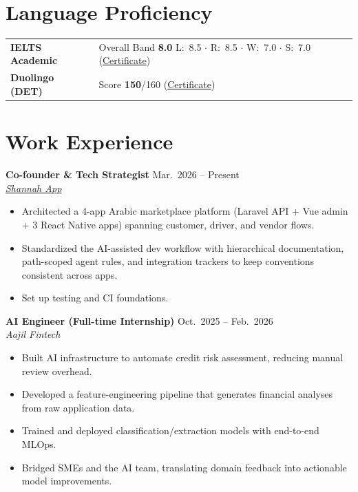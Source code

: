 \documentclass[a4paper,11pt]{article}
\begin{document}
\section{Language Proficiency}

\begin{tabular}{@{}l l@{}}
\textbf{IELTS Academic} & Overall Band \textbf{8.0} \quad L:~8.5 $\cdot$ R:~8.5 $\cdot$ W:~7.0 $\cdot$ S:~7.0 \quad (\href{https://drive.google.com/file/d/1XNIae4_Nk_kf3iOh6QK0ZJT7tzAMEPo4}{Certificate}) \\[3pt]
\textbf{Duolingo (DET)} & Score \textbf{150}/160 \quad
    (\href{https://certs.duolingo.com/hiwpvm048gwsijqu}{Certificate})
\end{tabular}

\section{Work Experience}

\textbf{Co-founder \& Tech Strategist} \hfill Mar.\ 2026 -- Present \\
\textit{\href{https://shnah.com/}{Shannah App}}
\begin{itemize}
    \item Architected a 4-app Arabic marketplace platform (Laravel API + Vue admin + 3 React Native apps) spanning customer, driver, and vendor flows.
    \item Standardized the AI-assisted dev workflow with hierarchical documentation, path-scoped agent rules, and integration trackers to keep conventions consistent across apps.
    \item Set up testing and CI foundations.
\end{itemize}

\textbf{AI Engineer (Full-time Internship)} \hfill Oct.\ 2025 -- Feb.\ 2026 \\
\textit{Aajil Fintech}
\begin{itemize}
    \item Built AI infrastructure to automate credit risk assessment, reducing manual review overhead.
    \item Developed a feature-engineering pipeline that generates financial analyses from raw application data.
    \item Trained and deployed classification/extraction models with end-to-end MLOps.
    \item Bridged SMEs and the AI team, translating domain feedback into actionable model improvements.
\end{itemize}
\end{document}
